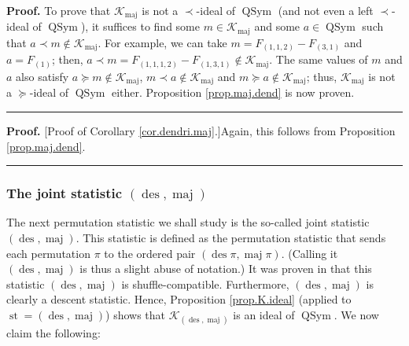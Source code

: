 \documentclass[numbers=enddot,12pt,final,onecolumn,notitlepage]{scrartcl}%
\theoremstyle{definition}
\newenvironment{proof}[1][Proof]{\noindent\textbf{#1.} }{\ \rule{0.5em}{0.5em}}
\newenvironment{verlong}{}{}
\begin{document}
\begin{verlong}
\begin{proof}
To prove that $\mathcal{K}_{\operatorname*{maj}}$ is not a $\left.
\prec\right.  $-ideal of $\operatorname*{QSym}$ (and not even a left $\left.
\prec\right.  $-ideal of $\operatorname*{QSym}$), it suffices to find some
$m\in\mathcal{K}_{\operatorname*{maj}}$ and some $a\in\operatorname*{QSym}$
such that $a\left.  \prec\right.  m\notin\mathcal{K}_{\operatorname*{maj}}$.
For example, we can take $m=F_{\left(  1,1,2\right)  }-F_{\left(  3,1\right)
}$ and $a=F_{\left(  1\right)  }$; then, $a\left.  \prec\right.  m=F_{\left(
1,1,1,2\right)  }-F_{\left(  1,3,1\right)  }\notin\mathcal{K}%
_{\operatorname*{maj}}$. The same values of $m$ and $a$ also satisfy $a\left.
\succeq\right.  m\notin\mathcal{K}_{\operatorname*{maj}}$, $m\left.
\prec\right.  a\notin\mathcal{K}_{\operatorname*{maj}}$ and $m\left.
\succeq\right.  a\notin\mathcal{K}_{\operatorname*{maj}}$; thus,
$\mathcal{K}_{\operatorname*{maj}}$ is not a $\left.  \succeq\right.  $-ideal
of $\operatorname*{QSym}$ either. Proposition \ref{prop.maj.dend} is now proven.
\end{proof}

\begin{proof}
[Proof of Corollary \ref{cor.dendri.maj}.]Again, this follows from Proposition
\ref{prop.maj.dend}.
\end{proof}

\subsubsection{The joint statistic $\left(  \operatorname*{des}%
,\operatorname*{maj}\right)  $}

The next permutation statistic we shall study is the so-called joint statistic
$\left(  \operatorname*{des},\operatorname*{maj}\right)  $. This statistic is
defined as the permutation statistic that sends each permutation $\pi$ to the
ordered pair $\left(  \operatorname*{des}\pi,\operatorname*{maj}\pi\right)  $.
(Calling it $\left(  \operatorname*{des},\operatorname*{maj}\right)  $ is thus
a slight abuse of notation.) It was proven in \cite[Theorem 4.5 \textbf{(a)}%
]{part1} that this statistic $\left(  \operatorname*{des},\operatorname*{maj}%
\right)  $ is shuffle-compatible. Furthermore, $\left(  \operatorname*{des}%
,\operatorname*{maj}\right)  $ is clearly a descent statistic. Hence,
Proposition \ref{prop.K.ideal} (applied to $\operatorname*{st}=\left(
\operatorname*{des},\operatorname*{maj}\right)  $) shows that $\mathcal{K}%
_{\left(  \operatorname*{des},\operatorname*{maj}\right)  }$ is an ideal of
$\operatorname*{QSym}$. We now claim the following:


\end{verlong}
\end{document}
